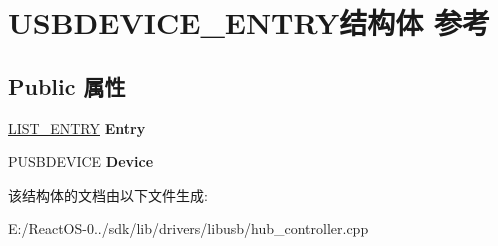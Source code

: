 \hypertarget{struct_u_s_b_d_e_v_i_c_e___e_n_t_r_y}{}\section{U\+S\+B\+D\+E\+V\+I\+C\+E\+\_\+\+E\+N\+T\+R\+Y结构体 参考}
\label{struct_u_s_b_d_e_v_i_c_e___e_n_t_r_y}
\subsection*{Public 属性}
\begin{DoxyCompactItemize}
\item 
\mbox{\label{struct_u_s_b_d_e_v_i_c_e___e_n_t_r_y_a42e52243cb08a5a9180a8e49f03ef2a2}} 
\hyperlink{struct___l_i_s_t___e_n_t_r_y}{L\+I\+S\+T\+\_\+\+E\+N\+T\+RY} {\bfseries Entry}
\item 
\mbox{\label{struct_u_s_b_d_e_v_i_c_e___e_n_t_r_y_a8ea6636a3a8e05707108ff5c7fc27487}} 
P\+U\+S\+B\+D\+E\+V\+I\+CE {\bfseries Device}
\end{DoxyCompactItemize}


该结构体的文档由以下文件生成\+:\begin{DoxyCompactItemize}
\item 
E\+:/\+React\+O\+S-\/0../sdk/lib/drivers/libusb/hub\+\_\+controller.\+cpp\end{DoxyCompactItemize}
